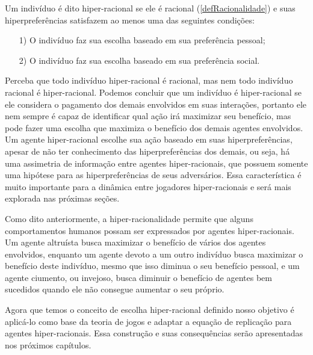 \begin{definition}
    Um indivíduo é dito hiper-racional se ele é racional (\ref{defRacionalidade}) e suas hiperpreferências satisfazem ao menos uma das seguintes condições:
    \begin{itemize}
        \item [1)] O indivíduo faz sua escolha baseado em sua preferência pessoal;
        \item [2)] O indivíduo faz sua escolha baseado em sua preferência social.
    \end{itemize}
\end{definition}

Perceba que todo indivíduo hiper-racional é racional, mas nem todo indivíduo racional é hiper-racional. Podemos concluir que um indivíduo é hiper-racional se ele considera o pagamento dos demais envolvidos em suas interações, portanto ele nem sempre é capaz de identificar qual ação irá maximizar seu benefício, mas pode fazer uma escolha que maximiza o benefício dos demais agentes envolvidos. Um agente hiper-racional escolhe sua ação baseado em suas hiperpreferências, apesar de não ter conhecimento das hiperpreferências dos demais, ou seja,  há uma assimetria de informação entre agentes hiper-racionais, que possuem somente uma hipótese para as hiperpreferências de seus adversários. Essa característica é muito importante para a dinâmica entre jogadores hiper-racionais e será mais explorada nas próximas seções.

Como dito anteriormente, a hiper-racionalidade permite que alguns comportamentos humanos possam ser expressados por agentes hiper-racionais. Um agente altruísta busca maximizar o benefício de vários dos agentes envolvidos, enquanto um agente devoto a um outro indivíduo busca maximizar o benefício deste indivíduo, mesmo que isso diminua o seu benefício pessoal, e um agente ciumento, ou invejoso, busca diminuir o benefício de agentes bem sucedidos quando ele não consegue aumentar o seu próprio.

Agora que temos o conceito de escolha hiper-racional definido nosso objetivo é aplicá-lo como base da teoria de jogos e adaptar a equação de replicação para agentes hiper-racionais. Essa construção e suas consequências serão apresentadas nos próximos capítulos.
